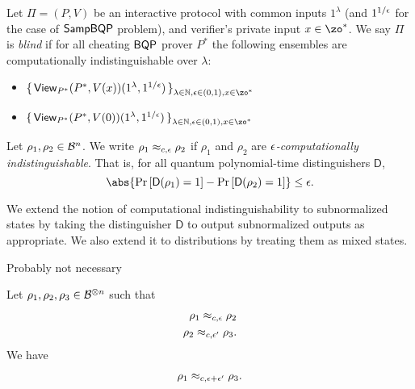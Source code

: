 \begin{definition}
	Let $\Pi=(P, V)$ be an interactive protocol with common inputs $1^\lambda$ (and $1^{1/\epsilon}$ for the case of $\operatorname{\mathsf{SampBQP}}$ problem), and verifier's private input $x\in\zo^*$.
	We say $\Pi$ is \emph{blind} if for all cheating $\operatorname{\mathsf{BQP}}$ prover $P^*$ the following ensembles are computationally indistinguishable over $\lambda$:
	\begin{itemize}
		\item $\set{\View_{P^*}(P^*, V(x))(1^\lambda, 1^{1/\eps})}_{\lambda\in\bbN, \eps\in(0,1), x\in\zo^*}$
		\item $\set{\View_{P^*}(P^*, V(0))(1^\lambda, 1^{1/\eps})}_{\lambda\in\bbN, \eps\in(0,1), x\in\zo^*}$
	\end{itemize}
\end{definition}

\begin{definition}
\label{def:comp-indis}
	Let $\rho_1,\rho_2\in\mathcal{B}^n$.
	We write $\rho_1\approx_{c,\epsilon}\rho_2$ if $\rho_1$ and $\rho_2$ are \emph{$\epsilon$-computationally indistinguishable}.
	That is, for all quantum polynomial-time  distinguishers $\mathsf{D}$,
	$$\abs{\Pr\left[\mathsf{D}(\rho_1)=1\right]-\Pr\left[\mathsf{D}(\rho_2)=1\right]}\leq\eps.$$
\end{definition}
We extend the notion of computational indistinguishability to subnormalized states by taking the distinguisher $\mathsf{D}$ to output subnormalized outputs as appropriate.
We also extend it to distributions by treating them as mixed states.

\iffalse

Probably not necessary

\begin{lem} \label{lem:computational-triangle0}
    Let $\rho_1, \rho_2, \rho_3\in\mathcal{B}^{\otimes n}$ such that 
    \begin{align}
		\rho_1\approx_{c, \epsilon}\rho_2\\
		\rho_2\approx_{c, \epsilon'}\rho_3.
    \end{align}
    We have 
    \begin{align}
		\rho_1\approx_{c, \epsilon+\epsilon'}\rho_3.
    \end{align}
\end{lem}

